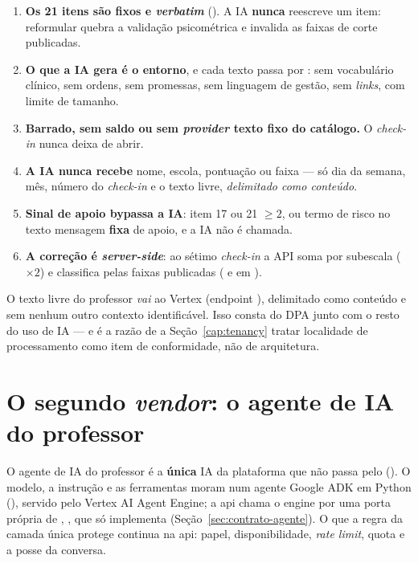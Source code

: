 \begin{regra}
\begin{enumerate}
  \item \textbf{Os 21 itens são fixos e \emph{verbatim}} (). A IA
    \textbf{nunca} reescreve um item: reformular quebra a validação psicométrica e
    invalida as faixas de corte publicadas.
  \item \textbf{O que a IA gera é o entorno}, e cada texto passa por
    : sem vocabulário clínico, sem ordens, sem
    promessas, sem linguagem de gestão, sem \emph{links}, com limite de tamanho.
  \item \textbf{Barrado, sem saldo ou sem \emph{provider} \implica{} texto fixo do
    catálogo.} O \emph{check-in} nunca deixa de abrir.
  \item \textbf{A IA nunca recebe} nome, escola, pontuação ou faixa --- só dia da
    semana, mês, número do \emph{check-in} e o texto livre, \emph{delimitado como
    conteúdo}.
  \item \textbf{Sinal de apoio bypassa a IA}: item 17 ou 21 $\geq 2$, ou termo de
    risco no texto \implica{} mensagem \textbf{fixa} de apoio, e a IA não é
    chamada.
  \item \textbf{A correção é \emph{server-side}}: ao sétimo \emph{check-in} a API
    soma por subescala ($\times 2$) e classifica pelas faixas publicadas
    ( e  em ).
\end{enumerate}
\end{regra}

\begin{nota}
O texto livre do professor \emph{vai} ao Vertex (endpoint ), delimitado
como conteúdo e sem nenhum outro contexto identificável. Isso consta do DPA junto
com o resto do uso de IA --- e é a razão de a Seção~\ref{cap:tenancy} tratar
localidade de processamento como item de conformidade, não de arquitetura.
\end{nota}

\section{O segundo \emph{vendor}: o agente de IA do professor}
\label{sec:ia-agente}

O agente de IA do professor é a \textbf{única} IA da plataforma que não passa pelo
 (). O modelo, a instrução e as ferramentas moram num
agente Google ADK em Python (), servido pelo Vertex AI
Agent Engine; a api chama o engine por uma porta própria de ,
, que só  implementa
(Seção~\ref{sec:contrato-agente}). O que a regra da camada única protege
continua na api: papel, disponibilidade, \emph{rate limit}, quota e a posse da
conversa.

